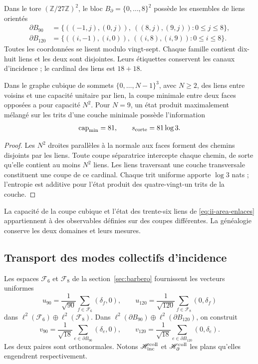 Dans le tore \((\mathbb Z/27\mathbb Z)^2\), le bloc
\(B_\partial=\{0,\ldots,8\}^2\) possède les ensembles de liens
orientés
\begin{align}
 \partial B_{90}
 &=\{((-1,j),(0,j)),\ ((8,j),(9,j)):0\le j\le8\},\\
 \partial B_{120}
 &=\{((i,-1),(i,0)),\ ((i,8),(i,9)):0\le i\le8\}.
 \label{eq:ii-area-enlaces}
\end{align}
Toutes les coordonnées se lisent modulo vingt-sept. Chaque famille contient
dix-huit liens et les deux sont disjointes. Leurs étiquettes conservent les
canaux d’incidence ; le cardinal des liens est \(18+18\).

\begin{theorem}
\label{thm:ii-area-corte-minimo}
Dans le graphe cubique de sommets \(\{0,\ldots,N-1\}^3\), avec
\(N\ge2\), des liens entre voisins et une capacité unitaire par lien,
la coupe minimale entre deux faces opposées a pour capacité \(N^2\).
Pour \(N=9\), un état produit maximalement mélangé sur les
trits d'une couche minimale possède l'information
\begin{equation}
 \operatorname{cap}_{\min}=81,\qquad s_{\rm corte}=81\log3.
 \label{eq:ii-area-corte-informacion}
\end{equation}
\end{theorem}
\begin{proof}
Les \(N^2\) droites parallèles à la normale aux faces forment des chemins
disjoints par les liens. Toute coupe séparatrice intercepte chaque chemin, de
sorte qu'elle contient au moins \(N^2\) liens. Les liens traversant
une couche transversale constituent une coupe de ce cardinal. Chaque trit
uniforme apporte \(\log3\) nats ; l'entropie est additive pour l'état
produit des quatre-vingt-un trits de la couche.
\end{proof}

La capacité de la coupe cubique et l'état des trente-six liens
de \eqref{eq:ii-area-enlaces} appartiennent à des observables définies sur
des coupes différentes. La généalogie conserve les deux domaines et leurs mesures.

\subsection{Transport des modes collectifs d'incidence}
\label{sec:ii-area-transporte-colectivo}

Les espaces \(\mathcal F_6\) et \(\mathcal F_8\) de la
section~\ref{sec:barbero} fournissent les vecteurs uniformes
\[
 u_{90}=\frac1{\sqrt{90}}\sum_{f\in\mathcal F_6}(\delta_f,0),
 \qquad
 u_{120}=\frac1{\sqrt{120}}\sum_{f\in\mathcal F_8}(0,\delta_f)
\]
dans \(\ell^2(\mathcal F_6)\oplus\ell^2(\mathcal F_8)\).
Dans \(\ell^2(\partial B_{90})\oplus\ell^2(\partial B_{120})\),
on construit
\[
 v_{90}=\frac1{\sqrt{18}}\sum_{e\in\partial B_{90}}(\delta_e,0),
 \qquad
 v_{120}=\frac1{\sqrt{18}}\sum_{e\in\partial B_{120}}(0,\delta_e).
\]
Les deux paires sont orthonormales. Notons
\(\mathscr H_{\rm inc}^{\rm coll}\) et
\(\mathscr H_\partial^{\rm coll}\) les plans qu'elles engendrent respectivement.


